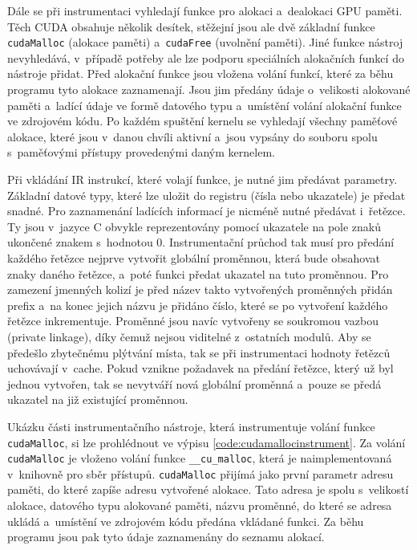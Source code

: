 Dále se při instrumentaci vyhledají funkce pro alokaci a~dealokaci GPU paměti. Těch CUDA obsahuje několik desítek, stěžejní jsou ale dvě základní funkce \texttt{cudaMalloc} (alokace paměti) a~\texttt{cudaFree} (uvolnění paměti). Jiné funkce nástroj nevyhledává, v~případě potřeby ale lze podporu speciálních alokačních funkcí do nástroje přidat. Před alokační funkce jsou vložena volání funkcí, které za běhu programu tyto alokace zaznamenají. Jsou jim předány údaje o~velikosti alokované paměti a~ladící údaje ve formě datového typu a~umístění volání alokační funkce ve zdrojovém kódu. Po každém spuštění kernelu se vyhledají všechny paměťové alokace, které jsou v~danou chvíli aktivní a~jsou vypsány do souboru spolu s~paměťovými přístupy provedenými daným kernelem.

Při vkládání IR instrukcí, které volají funkce, je nutné jim předávat parametry. Základní datové typy, které lze uložit do registru (čísla nebo ukazatele) je předat snadné. Pro zaznamenání ladících informací je nicméně nutné předávat i~řetězce. Ty jsou v~jazyce C obvykle reprezentovány pomocí ukazatele na pole znaků ukončené znakem s~hodnotou 0. Instrumentační průchod tak musí pro předání každého řetězce nejprve vytvořit globální proměnnou, která bude obsahovat znaky daného řetězce, a~poté funkci předat ukazatel na tuto proměnnou. Pro zamezení jmenných kolizí je před název takto vytvořených proměnných přidán prefix a~na konec jejich názvu je přidáno číslo, které se po vytvoření každého řetězce inkrementuje. Proměnné jsou navíc vytvořeny se soukromou vazbou (private linkage), díky čemuž nejsou viditelné z~ostatních modulů. Aby se předešlo zbytečnému plýtvání místa, tak se při instrumentaci hodnoty řetězců uchovávají v~cache. Pokud vznikne požadavek na předání řetězce, který už byl jednou vytvořen, tak se nevytváří nová globální proměnná a~pouze se předá ukazatel na již existující proměnnou.

Ukázku části instrumentačního nástroje, která instrumentuje volání funkce \texttt{cudaMalloc}, si lze prohlédnout ve výpisu \ref{code:cudamallocinstrument}. Za volání \texttt{cudaMalloc} je vloženo volání funkce \texttt{\_\_cu\_malloc}, která je naimplementovaná v~knihovně pro sběr přístupů. \texttt{cudaMalloc} přijímá jako první parametr adresu paměti, do které zapíše adresu vytvořené alokace. Tato adresa je spolu s~velikostí alokace, datového typu alokované paměti, názvu proměnné, do které se adresa ukládá a~umístění ve zdrojovém kódu předána vkládané funkci. Za běhu programu jsou pak tyto údaje zaznamenány do seznamu alokací.

